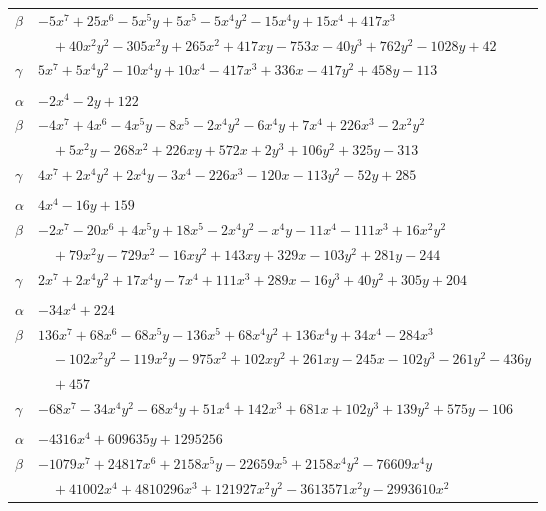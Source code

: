 \documentclass[11pt]{article}
\begin{document}
\begin{longtable}{@{}ll@{}}
$\beta$ & $-5x^{7}+25x^{6}-5x^{5}y+5x^{5}-5x^{4}y^{2}-15x^{4}y+15x^{4}+417x^{3}$\\
 & $\quad +40x^{2}y^{2}-305x^{2}y+265x^{2}+417xy-753x-40y^{3}+762y^{2}-1028y+42$\\
$\gamma$ & $5x^{7}+5x^{4}y^{2}-10x^{4}y+10x^{4}-417x^{3}+336x-417y^{2}+458y-113$\\
\addlinespace[3pt]
\multicolumn{2}{@{}l}{$\{i,j\}=\{24,106\}$, $k_{ij}=2^{4}\cdot 3^{2}\cdot 5$}\\
$\alpha$ & $-2x^{4}-2y+122$\\
$\beta$ & $-4x^{7}+4x^{6}-4x^{5}y-8x^{5}-2x^{4}y^{2}-6x^{4}y+7x^{4}+226x^{3}-2x^{2}y^{2}$\\
 & $\quad +5x^{2}y-268x^{2}+226xy+572x+2y^{3}+106y^{2}+325y-313$\\
$\gamma$ & $4x^{7}+2x^{4}y^{2}+2x^{4}y-3x^{4}-226x^{3}-120x-113y^{2}-52y+285$\\
\addlinespace[3pt]
\multicolumn{2}{@{}l}{$\{i,j\}=\{25,30\}$, $k_{ij}=3\cdot 11^{2}$}\\
$\alpha$ & $4x^{4}-16y+159$\\
$\beta$ & $-2x^{7}-20x^{6}+4x^{5}y+18x^{5}-2x^{4}y^{2}-x^{4}y-11x^{4}-111x^{3}+16x^{2}y^{2}$\\
 & $\quad +79x^{2}y-729x^{2}-16xy^{2}+143xy+329x-103y^{2}+281y-244$\\
$\gamma$ & $2x^{7}+2x^{4}y^{2}+17x^{4}y-7x^{4}+111x^{3}+289x-16y^{3}+40y^{2}+305y+204$\\
\addlinespace[3pt]
\multicolumn{2}{@{}l}{$\{i,j\}=\{25,37\}$, $k_{ij}=2\cdot 3\cdot 5\cdot 11$}\\
$\alpha$ & $-34x^{4}+224$\\
$\beta$ & $136x^{7}+68x^{6}-68x^{5}y-136x^{5}+68x^{4}y^{2}+136x^{4}y+34x^{4}-284x^{3}$\\
 & $\quad -102x^{2}y^{2}-119x^{2}y-975x^{2}+102xy^{2}+261xy-245x-102y^{3}-261y^{2}-436y$\\
 & $\quad +457$\\
$\gamma$ & $-68x^{7}-34x^{4}y^{2}-68x^{4}y+51x^{4}+142x^{3}+681x+102y^{3}+139y^{2}+575y-106$\\
\addlinespace[3pt]
\multicolumn{2}{@{}l}{$\{i,j\}=\{25,64\}$, $k_{ij}=2\cdot 3^{2}\cdot 5^{2}\cdot 7\cdot 11\cdot 17$}\\
$\alpha$ & $-4316x^{4}+609635y+1295256$\\
$\beta$ & $-1079x^{7}+24817x^{6}+2158x^{5}y-22659x^{5}+2158x^{4}y^{2}-76609x^{4}y$\\
 & $\quad +41002x^{4}+4810296x^{3}+121927x^{2}y^{2}-3613571x^{2}y-2993610x^{2}$\\

\end{longtable}
\end{document}
